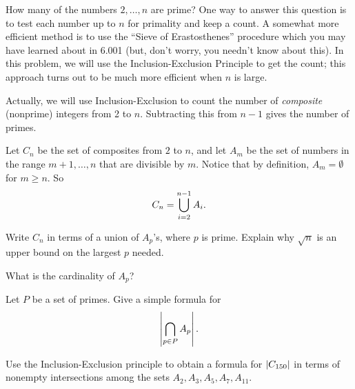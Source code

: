 \documentclass[11pt,twoside]{article}
\begin{document}
\iffalse

\begin{problem}
How many of the numbers $2, \dots, n$ are prime?  One way to answer this
question is to test each number up to $n$ for primality and keep a count.
A somewhat more efficient method is to use the ``Sieve of Erastosthenes''
procedure which you may have learned about in 6.001 (but, don't worry, you
needn't know about this).  In this problem, we will use the
Inclusion-Exclusion Principle to get the count; this approach turns out to
be much more efficient when $n$ is large.

Actually, we will use Inclusion-Exclusion to count the number of
\emph{composite} (nonprime) integers from 2 to $n$.  Subtracting this
from $n-1$ gives the number of primes.

Let $C_n$ be the set of composites from $2$ to $n$, and let $A_m$ be the
set of numbers in the range $m+1,\dots,n$ that are divisible by $m$.
Notice that by definition, $A_m = \emptyset$ for $m \geq n$.
So
\[
C_n = \bigcup_{i=2}^{n-1} A_i.
\]

\bparts

\ppart Write $C_n$ in terms of a union of $A_p$'s, where $p$ is prime.
Explain why $\sqrt{n}$ is an upper bound on the largest $p$ needed.


\ppart What is the cardinality of $A_p$?


\ppart Let $P$ be a set of primes.  Give a simple formula for
\[
\left|\bigcap_{p \in P} A_p\right|.
\]


\ppart Use the Inclusion-Exclusion principle to obtain a formula for
$\left|C_{150}\right|$ in terms of nonempty intersections among the sets
$A_2,A_3,A_5,A_7, A_{11}$.


\end{problem}
\end{document}
